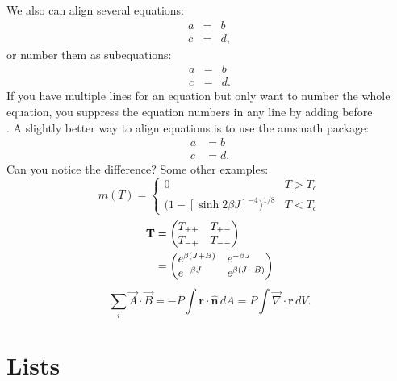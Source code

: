 \documentclass[a4paper,10pt,extramargin]{tubsartcl}
\begin{document}
We also can align several equations:
\begin{eqnarray}
a & =& b \\
c &=& d ,
\end{eqnarray}
or number them as subequations:
\begin{subequations}     %
\begin{eqnarray}
a & =& b \\
c &=& d .
\end{eqnarray}
\end{subequations}
If you have multiple lines for an equation but only want to number the whole 
equation, you suppress the equation numbers in any line by adding \nonumber before \\. 
A slightly better way to align equations is to use the amsmath package:
\begin{subequations} 
\begin{align}
a & = b \\
c &= d .
\end{align}
\end{subequations}
Can you notice the difference?
Some other examples:
\begin{equation}
\label{eq:mdiv}
m(T) =
\begin{cases}
0 & \text{$T > T_c$} \\
\bigl(1 - [\sinh 2 \beta J]^{-4} \bigr)^{\! 1/8} & \text{$T < T_c$}
\end{cases}
\end{equation}
\begin{align}
\textbf{T} &=
\begin{pmatrix}
T_{++} \hfill & T_{+-} \\
T_{-+} & T_{--} \hfill 
\end{pmatrix} \nonumber \\
& =
\begin{pmatrix}
e^{\beta (J + B)} \hfill & e^{-\beta J} \hfill \\
e^{-\beta J} \hfill & e^{\beta (J - B)} \hfill
\end{pmatrix}
\end{align}
\newcommand{\rv}{\textbf{r}}
\begin{equation}
\sum_i \vec A \cdot \vec B = -P \! \int \! \rv \cdot
\hat{\mathbf{n}}\, dA = P \! \int \! {\vec \nabla} \cdot \rv\, dV.
\end{equation}

\section{Lists}
\end{document}
